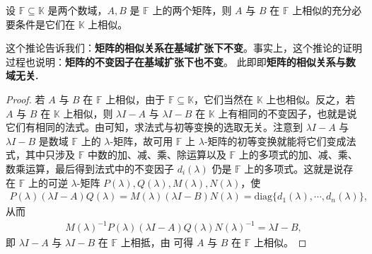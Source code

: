 \documentclass[../../main.tex]{subfiles}%
\begin{document}
\begin{corollary}[矩阵的相似关系在基域扩张下不变]\label{corollary:矩阵的相似关系在基域扩张下不变}
设 $\mathbb{F}\subseteq\mathbb{K}$ 是两个数域，$A, B$ 是 $\mathbb{F}$ 上的两个矩阵，则 $A$ 与 $B$ 在 $\mathbb{F}$ 上相似的充分必要条件是它们在 $\mathbb{K}$ 上相似。
\end{corollary}
\begin{note}
这个推论告诉我们：\textbf{矩阵的相似关系在基域扩张下不变}。事实上，这个推论的证明过程也说明：\textbf{矩阵的不变因子在基域扩张下也不变}。 此即即\textbf{矩阵的相似关系与数域无关.}
\end{note}
\begin{proof}
若 $A$ 与 $B$ 在 $\mathbb{F}$ 上相似，由于 $\mathbb{F}\subseteq\mathbb{K}$，它们当然在 $\mathbb{K}$ 上也相似。反之，若 $A$ 与 $B$ 在 $\mathbb{K}$ 上相似，则 $\lambda I - A$ 与 $\lambda I - B$ 在 $\mathbb{K}$ 上有相同的不变因子，也就是说它们有相同的法式。由可知，求法式与初等变换的选取无关。注意到 $\lambda I - A$ 与 $\lambda I - B$ 是数域 $\mathbb{F}$ 上的 $\lambda$-矩阵，故可用 $\mathbb{F}$ 上 $\lambda$-矩阵的初等变换就能将它们变成法式，其中只涉及 $\mathbb{F}$ 中数的加、减、乘、除运算以及 $\mathbb{F}$ 上的多项式的加、减、乘、数乘运算，最后得到法式中的不变因子 $d_i(\lambda)$ 仍是 $\mathbb{F}$ 上的多项式。这就是说存在 $\mathbb{F}$ 上的可逆 $\lambda$-矩阵 $P(\lambda), Q(\lambda), M(\lambda), N(\lambda)$，使
\begin{align*}
P(\lambda)(\lambda I - A)Q(\lambda)=M(\lambda)(\lambda I - B)N(\lambda)=\mathrm{diag}\{d_1(\lambda),\cdots,d_n(\lambda)\},
\end{align*}
从而
\begin{align*}
M(\lambda)^{-1}P(\lambda)(\lambda I - A)Q(\lambda)N(\lambda)^{-1}=\lambda I - B,
\end{align*}
即 $\lambda I - A$ 与 $\lambda I - B$ 在 $\mathbb{F}$ 上相抵，由 可得 $A$ 与 $B$ 在 $\mathbb{F}$ 上相似。
\end{proof}
\end{document}
